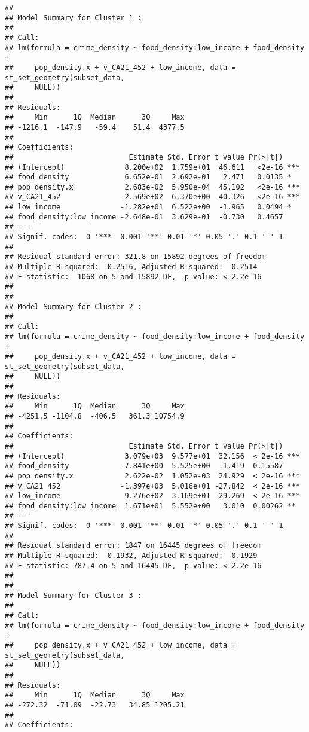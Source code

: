 \documentclass[
]{article}
\begin{document}
\begin{verbatim}
## 
## Model Summary for Cluster 1 :
## 
## Call:
## lm(formula = crime_density ~ food_density:low_income + food_density + 
##     pop_density.x + v_CA21_452 + low_income, data = st_set_geometry(subset_data, 
##     NULL))
## 
## Residuals:
##     Min      1Q  Median      3Q     Max 
## -1216.1  -147.9   -59.4    51.4  4377.5 
## 
## Coefficients:
##                           Estimate Std. Error t value Pr(>|t|)    
## (Intercept)              8.200e+02  1.759e+01  46.611   <2e-16 ***
## food_density             6.652e-01  2.692e-01   2.471   0.0135 *  
## pop_density.x            2.683e-02  5.950e-04  45.102   <2e-16 ***
## v_CA21_452              -2.569e+02  6.370e+00 -40.326   <2e-16 ***
## low_income              -1.282e+01  6.522e+00  -1.965   0.0494 *  
## food_density:low_income -2.648e-01  3.629e-01  -0.730   0.4657    
## ---
## Signif. codes:  0 '***' 0.001 '**' 0.01 '*' 0.05 '.' 0.1 ' ' 1
## 
## Residual standard error: 321.8 on 15892 degrees of freedom
## Multiple R-squared:  0.2516, Adjusted R-squared:  0.2514 
## F-statistic:  1068 on 5 and 15892 DF,  p-value: < 2.2e-16
## 
## 
## Model Summary for Cluster 2 :
## 
## Call:
## lm(formula = crime_density ~ food_density:low_income + food_density + 
##     pop_density.x + v_CA21_452 + low_income, data = st_set_geometry(subset_data, 
##     NULL))
## 
## Residuals:
##     Min      1Q  Median      3Q     Max 
## -4251.5 -1104.8  -406.5   361.3 10754.9 
## 
## Coefficients:
##                           Estimate Std. Error t value Pr(>|t|)    
## (Intercept)              3.079e+03  9.577e+01  32.156  < 2e-16 ***
## food_density            -7.841e+00  5.525e+00  -1.419  0.15587    
## pop_density.x            2.622e-02  1.052e-03  24.929  < 2e-16 ***
## v_CA21_452              -1.397e+03  5.016e+01 -27.842  < 2e-16 ***
## low_income               9.276e+02  3.169e+01  29.269  < 2e-16 ***
## food_density:low_income  1.671e+01  5.552e+00   3.010  0.00262 ** 
## ---
## Signif. codes:  0 '***' 0.001 '**' 0.01 '*' 0.05 '.' 0.1 ' ' 1
## 
## Residual standard error: 1847 on 16445 degrees of freedom
## Multiple R-squared:  0.1932, Adjusted R-squared:  0.1929 
## F-statistic: 787.4 on 5 and 16445 DF,  p-value: < 2.2e-16
## 
## 
## Model Summary for Cluster 3 :
## 
## Call:
## lm(formula = crime_density ~ food_density:low_income + food_density + 
##     pop_density.x + v_CA21_452 + low_income, data = st_set_geometry(subset_data, 
##     NULL))
## 
## Residuals:
##     Min      1Q  Median      3Q     Max 
## -272.32  -71.09  -22.73   34.85 1205.21 
## 
## Coefficients:

\end{verbatim}
\end{document}
